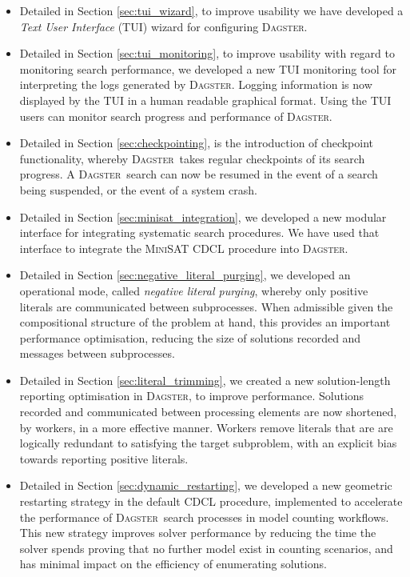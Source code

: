 \documentclass[10pt,a4paper,oneside,headinclude,footinclude,BCOR5mm]{scrartcl}
\newcommand{\dagster}{\textsc{Dagster}\xspace}
\begin{document}
\begin{itemize}
\item	Detailed in Section \ref{sec:tui_wizard}, to improve usability we have developed a {\em Text User Interface} (TUI) wizard for configuring \dagster.
  
\item	Detailed in Section \ref{sec:tui_monitoring}, to improve usability with regard to monitoring search performance, we developed a new TUI monitoring tool for  interpreting the logs generated by \dagster. Logging information is now displayed by the TUI in a human readable graphical format. Using the TUI users can monitor search progress and performance of \dagster.
  
\item	Detailed in Section \ref{sec:checkpointing}, is the introduction of checkpoint functionality, whereby \dagster\ takes regular checkpoints of its search progress. A \dagster\ search can now be resumed in the event of a search being suspended, or the event of a system crash.
  
\item	Detailed in Section \ref{sec:minisat_integration}, we developed a new modular interface for integrating systematic search procedures. We have used that interface to integrate the \textsc{MiniSAT} \textsc{CDCL} procedure into \dagster.
  
\item	Detailed in Section \ref{sec:negative_literal_purging}, we developed an operational mode, called {\em negative literal purging}, whereby only positive literals are communicated between subprocesses. When admissible given the compositional structure of the problem at hand, this provides an important performance optimisation, reducing the size of solutions recorded and messages between subprocesses.
  
\item	Detailed in Section \ref{sec:literal_trimming}, we created a new solution-length reporting optimisation in \dagster, to improve performance. Solutions recorded and communicated between processing elements are now shortened, by workers, in a more effective manner. Workers remove literals that are are logically redundant to satisfying the target subproblem, with an explicit bias towards reporting positive literals.
  
\item	Detailed in Section \ref{sec:dynamic_restarting}, we developed a new geometric restarting strategy in the default CDCL procedure, implemented to accelerate the performance of \dagster\ search processes in model counting workflows. This new strategy improves solver performance by reducing the time the solver spends proving that no further model exist in counting scenarios, and has minimal impact on  the efficiency of enumerating solutions.


\end{itemize}
\end{document}
